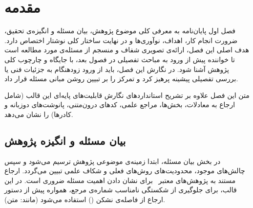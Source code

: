 %


\chapter{مقدمه}\label{chap:chapter1_introduction}

فصل اول پایان‌نامه به معرفی کلی موضوع پژوهش، بیان مسئله و انگیزه‌ی تحقیق، ضرورت انجام کار، اهداف، نوآوری‌ها و در نهایت ساختار کلی نوشتار اختصاص دارد. هدف اصلی این فصل، ارائه‌ی تصویری شفاف و منسجم از مسئله‌ی مورد مطالعه است تا خواننده پیش از ورود به مباحث تفصیلی در فصول بعد، با جایگاه و چارچوب کلی پژوهش آشنا شود. در نگارش این فصل، باید از ورود زودهنگام به جزئیات فنی یا بررسی تفصیلی پیشینه پرهیز کرد و تمرکز را بر تبیین روشن مبانی مسئله قرار داد.

متن این فصل علاوه بر تشریح استانداردهای نگارش قابلیت‌های پایه‌ای این قالب (شامل ارجاع به معادلات، بخش‌ها، مراجع علمی، کدهای درون‌متنی، پانوشت‌های دوزبانه و کادرها) را نشان می‌دهد.


\section{بیان مسئله و انگیزه پژوهش}\label{sec:1-1}

در بخش بیان مسئله، ابتدا زمینه‌ی موضوعی پژوهش ترسیم می‌شود و سپس چالش‌های موجود، محدودیت‌های روش‌های فعلی و شکاف علمی تبیین می‌گردد. ارجاع مستند به پژوهش‌های معتبر~\cite{sample_article, sample_book} برای نشان دادن اهمیت مسئله ضروری است. در این قالب، برای جلوگیری از شکستگی نامناسب شماره‌ی مرجع، همواره پیش از دستور ارجاع از فاصله‌ی نشکن (\lr{\textasciitilde}) استفاده می‌شود (مانند: متن).

